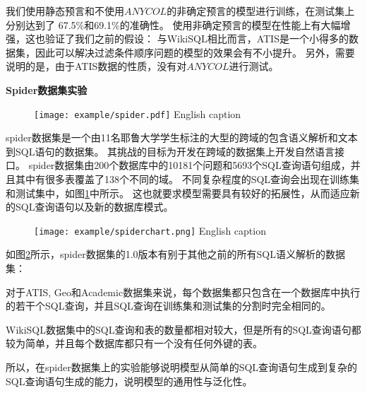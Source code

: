 我们使用静态预言和不使用$ANYCOL$的非确定预言的模型进行训练，在测试集上分别达到了 67.5\%和69.1\%的准确性。
使用非确定预言的模型在性能上有大幅增强，这也验证了我们之前的假设：
与WikiSQL相比而言，ATIS是一个小得多的数据集，因此可以解决过滤条件顺序问题的模型的效果会有不小提升。
另外，需要说明的是，由于ATIS数据的性质，没有对$ANYCOL$进行测试。

\textbf{Spider数据集实验}

\begin{figure}[!htp]
  \centering
  \texttt{[image: example/spider.pdf]}
    {English caption}
  \label{fig:spiderxample}
\end{figure}

spider数据集是一个由11名耶鲁大学学生标注的大型的跨域的包含语义解析和文本到SQL语句的数据集。
其挑战的目标为开发在跨域的数据集上开发自然语言接口。
spider数据集由200个数据库中的10181个问题和5693个SQL查询语句组成，并且其中有很多表覆盖了138个不同的域。
不同复杂程度的SQL查询会出现在训练集和测试集中，如图\ref{fig:spiderxample}中所示。
这也就要求模型需要具有较好的拓展性，从而适应新的SQL查询语句以及新的数据库模式。

\begin{figure}[!htp]
  \centering
  \texttt{[image: example/spiderchart.png]}
    {English caption}
  \label{fig:spiderchart}
\end{figure}

如图\ref{fig:spiderchart}所示，spider数据集的1.0版本有别于其他之前的所有SQL语义解析的数据集：

\begin{itemize*}
  \item 对于ATIS, Geo和Academic数据集来说，每个数据集都只包含在一个数据库中执行的若干个SQL查询，并且SQL查询在训练集和测试集的分割时完全相同的。
  
  \item WikiSQL数据集中的SQL查询和表的数量都相对较大，但是所有的SQL查询语句都较为简单，并且每个数据库都只有一个没有任何外键的表。  
\end{itemize*}

所以，在spider数据集上的实验能够说明模型从简单的SQL查询语句生成到复杂的SQL查询语句生成的能力，说明模型的通用性与泛化性。

